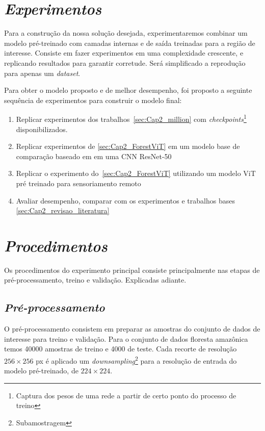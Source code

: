 

\section{\textit{Experimentos}}\label{sec:Cap3_Experimentos}

Para a construção da nossa solução desejada, experimentaremos combinar um modelo pré-treinado com camadas internas e de saída treinadas para a região de interesse.
Consiste em fazer experimentos em uma complexidade crescente, e replicando resultados para garantir corretude. Será simplificado a reprodução para apenas um \textit{dataset}.


Para obter o modelo proposto e de melhor desempenho, foi proposto a seguinte sequência de experimentos para construir o modelo final:

\begin{enumerate}
\item  Replicar experimentos dos trabalhos~\ref{sec:Cap2_million} com \textit{checkpoints}\footnote{Captura dos pesos de uma rede a partir de certo ponto do processo de treino} disponibilizados. 
\item  Replicar experimentos de \ref{sec:Cap2_ForestViT} em um modelo base de comparação baseado em em uma CNN ResNet-50
\item  Replicar o experimento do~\ref{sec:Cap2_ForestViT} utilizando um modelo ViT pré treinado para sensoriamento remoto
\item Avaliar desempenho, comparar com os experimentos e trabalhos bases \ref{sec:Cap2_revisao_literatura}
\end{enumerate}


    

\section{\textit{Procedimentos}}\label{sec:Cap3_Procedimentos}

Os procedimentos do experimento principal consiste principalmente nas etapas de 
pré-processamento, treino e validação. Explicadas adiante.

\subsection{\textit{Pré-processamento}}\label{sec:Cap3_PreProcess}
O pré-processamento consistem em preparar as amostras do conjunto de dados de interesse para treino e validação. Para o conjunto de dados floresta amazônica temos 40000 amostras de treino e 4000 de teste. Cada recorte de resolução $256 \times 256$ px é aplicado um \textit{downsampling}\footnote{Subamostragem} para a resolução de entrada do modelo pré-treinado, de $224 \times 224$. 

